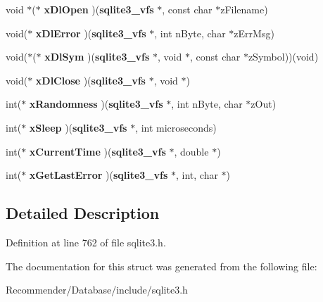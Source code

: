 \begin{CompactItemize}
\item 
void $\ast$($\ast$ \textbf{xDlOpen} )({\bf sqlite3\_\-vfs} $\ast$, const char $\ast$zFilename)\label{structsqlite3__vfs_1bd905c95befee4d686c0d3e10edd70b}

\item 
void($\ast$ \textbf{xDlError} )({\bf sqlite3\_\-vfs} $\ast$, int nByte, char $\ast$zErrMsg)\label{structsqlite3__vfs_2a682fd5ad29e633f65441e7147c6b38}

\item 
void($\ast$($\ast$ \textbf{xDlSym} )({\bf sqlite3\_\-vfs} $\ast$, void $\ast$, const char $\ast$zSymbol))(void)\label{structsqlite3__vfs_e43e7134858d88b6104cef2a4aef72d4}

\item 
void($\ast$ \textbf{xDlClose} )({\bf sqlite3\_\-vfs} $\ast$, void $\ast$)\label{structsqlite3__vfs_9afef84db68e33bf6d94add4a8a7b24f}

\item 
int($\ast$ \textbf{xRandomness} )({\bf sqlite3\_\-vfs} $\ast$, int nByte, char $\ast$zOut)\label{structsqlite3__vfs_b2a1ae7c84e12eafb727d8def03d28a0}

\item 
int($\ast$ \textbf{xSleep} )({\bf sqlite3\_\-vfs} $\ast$, int microseconds)\label{structsqlite3__vfs_78dd047fb761ec85fb58582ba98b8bf9}

\item 
int($\ast$ \textbf{xCurrentTime} )({\bf sqlite3\_\-vfs} $\ast$, double $\ast$)\label{structsqlite3__vfs_d219f77cf376bde9d3c4cfd831116144}

\item 
int($\ast$ \textbf{xGetLastError} )({\bf sqlite3\_\-vfs} $\ast$, int, char $\ast$)\label{structsqlite3__vfs_489cbf27a20784bc30fec3bf363e62b2}

\end{CompactItemize}


\subsection{Detailed Description}




Definition at line 762 of file sqlite3.h.

The documentation for this struct was generated from the following file:\begin{CompactItemize}
\item 
Recommender/Database/include/sqlite3.h\end{CompactItemize}
